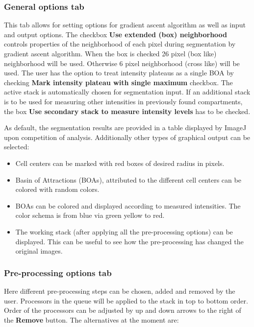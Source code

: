 \documentclass[a4paper,12pt]{article}
\begin{document}
\subsubsection{General options tab}
\label{sec:general}
This tab allows for setting options for gradient ascent algorithm as well as
input and output options.  The checkbox \textbf{Use extended (box)
neighborhood} controls properties of the neighborhood of each pixel during
segmentation by gradient ascent algorithm. When the box is checked 26 pixel
(box like) neighborhood will be used. Otherwise 6 pixel neighborhood (cross
like) will be used.  The user has the option to treat intensity plateaus as a
single BOA by checking \textbf{Mark intensity plateau with single maximum}
checkbox.  The active stack is automatically chosen for segmentation input. If
an additional stack is to be used for measuring other intensities in
previously found compartments, the box \textbf{Use secondary stack to measure
intensity levels} has to be checked.

As default, the segmentation results are provided in a table displayed by
ImageJ upon competition of analysis. Additionally other types of graphical output can be selected:

\begin{itemize}
%
\item Cell centers can be marked with red boxes of desired radius in pixels.
%
\item Basin of Attractions (BOAs), attributed to the different cell centers can be
	colored with random colors.
%
\item BOAs can be colored and displayed according to measured intensities. The color schema is from blue via green yellow to red.
%
\item The working stack (after applying all the pre-processing options) can be displayed. This can be useful to see how the
	pre-processing has changed the original images.
%
\end{itemize}

\subsubsection{Pre-processing options tab}
Here different pre-processing steps can be chosen, added and removed by the
user. Processors in the queue will be applied to the stack in top to bottom order. Order of the processors can be adjusted by up and down arrows to the right of the \textbf{Remove} button. The alternatives at the moment are:
\end{document}
